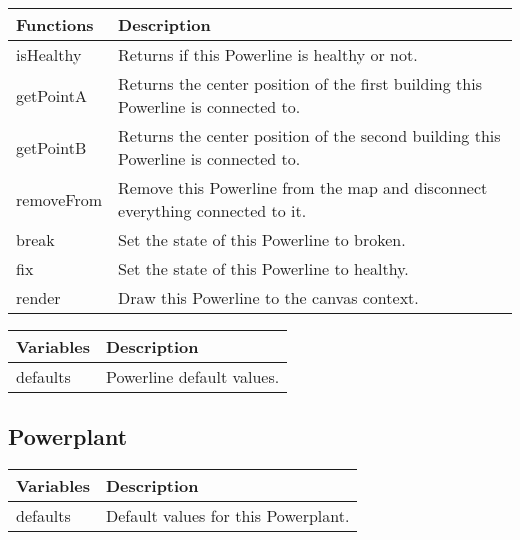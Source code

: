 	\begin{table}[H]
	\begin{tabular}{p{4cm} | p{8cm} }
	\hline
	\rowcolor{gray}
	Functions & Description \\ \hline
	isHealthy & Returns if this Powerline is healthy or not. \\ \hline
	getPointA & Returns the center position of the first building this Powerline is connected to. \\ \hline
	getPointB & Returns the center position of the second building this Powerline is connected to. \\ \hline
	removeFrom & Remove this Powerline from the map and disconnect everything connected to it. \\ \hline
	break & Set the state of this Powerline to broken. \\ \hline
	fix & Set the state of this Powerline to healthy. \\ \hline
	render & Draw this Powerline to the canvas context. \\ \hline
	\end{tabular}
	\end{table}

	\begin{table}[H]
	\begin{tabular}{p{4cm} | p{8cm} }
	\hline
	\rowcolor{gray}
	Variables & Description \\ \hline
	defaults & Powerline default values. \\ \hline
	\end{tabular}
	\end{table}

\subsection*{Powerplant}

	\begin{table}[H]
	\begin{tabular}{p{4cm} | p{8cm} }
	\hline
	\rowcolor{gray}
	Variables & Description \\ \hline
	defaults & Default values for this Powerplant. \\ \hline
	\end{tabular}
	\end{table}

